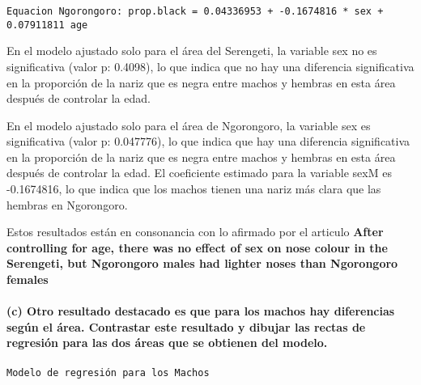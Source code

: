 \documentclass[
]{article}
\begin{document}
\begin{verbatim}
Equacion Ngorongoro: prop.black = 0.04336953 + -0.1674816 * sex + 0.07911811 age
\end{verbatim}

En el modelo ajustado solo para el área del Serengeti, la variable sex
no es significativa (valor p: 0.4098), lo que indica que no hay una
diferencia significativa en la proporción de la nariz que es negra entre
machos y hembras en esta área después de controlar la edad.

En el modelo ajustado solo para el área de Ngorongoro, la variable sex
es significativa (valor p: 0.047776), lo que indica que hay una
diferencia significativa en la proporción de la nariz que es negra entre
machos y hembras en esta área después de controlar la edad. El
coeficiente estimado para la variable sexM es -0.1674816, lo que indica
que los machos tienen una nariz más clara que las hembras en Ngorongoro.

Estos resultados están en consonancia con lo afirmado por el articulo
\textbf{After controlling for age, there was no effect of sex on nose
colour in the Serengeti, but Ngorongoro males had lighter noses than
Ngorongoro females}

\hypertarget{c-otro-resultado-destacado-es-que-para-los-machos-hay-diferencias-seguxfan-el-uxe1rea.-contrastar-este-resultado-y-dibujar-las-rectas-de-regresiuxf3n-para-las-dos-uxe1reas-que-se-obtienen-del-modelo.}{%
\paragraph{\texorpdfstring{\textbf{(c) Otro resultado destacado es que
para los machos hay diferencias según el área. Contrastar este resultado
y dibujar las rectas de regresión para las dos áreas que se obtienen del
modelo.}}{(c) Otro resultado destacado es que para los machos hay diferencias según el área. Contrastar este resultado y dibujar las rectas de regresión para las dos áreas que se obtienen del modelo.}}\label{c-otro-resultado-destacado-es-que-para-los-machos-hay-diferencias-seguxfan-el-uxe1rea.-contrastar-este-resultado-y-dibujar-las-rectas-de-regresiuxf3n-para-las-dos-uxe1reas-que-se-obtienen-del-modelo.}}

\begin{verbatim}
Modelo de regresión para los Machos
\end{verbatim}
\end{document}
